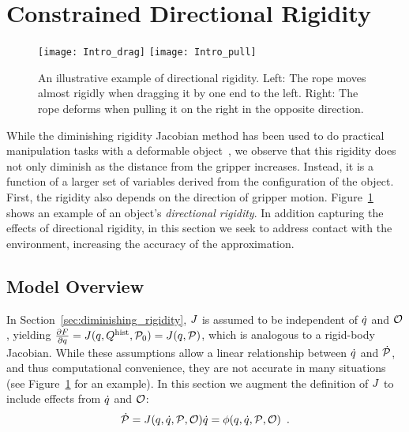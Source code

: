 
\section{Constrained Directional Rigidity}
\label{sec:constrained_model}

\begin{figure}[t]
    \centering
    \texttt{[image: Intro\_drag]}\hfill
    \texttt{[image: Intro\_pull]}%
    \caption{An illustrative example of directional rigidity. Left: The rope moves almost rigidly when dragging it by one end to the left. Right: The rope deforms when pulling it on the right in the opposite direction.}
    \label{fig:intro_directional_rigidity}
\end{figure}

While the diminishing rigidity Jacobian method has been used to do practical manipulation tasks with a deformable object~\cite{Berenson2013}, we observe that this rigidity does not only diminish as the distance from the gripper increases. Instead, it is a function of a larger set of variables derived from the configuration of the object. First, the rigidity also depends on the direction of gripper motion. Figure~\ref{fig:intro_directional_rigidity} shows an example of an object's \textit{directional rigidity}. In addition capturing the effects of directional rigidity, in this section we seek to address contact with the environment, increasing the accuracy of the approximation.

\subsection{Model Overview}

In Section~\ref{sec:diminishing_rigidity}, $J$ is assumed to be independent of $\dot{q}$ and $\mathcal{O}$, yielding $\frac{\partial F}{\partial q} = J(q, Q^{\textrm{hist}}, \mathcal{P}_0) = J(q, \mathcal{P})$, which is analogous to a rigid-body Jacobian. While these assumptions allow a linear relationship between $\dot{q}$ and $\dot{\mathcal{P}}$, and thus computational convenience, they are not accurate in many situations (see Figure~\ref{fig:intro_directional_rigidity} for an example). In this section we augment the definition of $J$ to include effects from $\dot{q}$ and $\mathcal{O}$:
\begin{equation}
    \dot{\mathcal{P}} = J(q, \dot{q}, \mathcal{P}, \mathcal{O}) \dot{q} = \phi(q, \dot{q}, \mathcal{P}, \mathcal{O}) \enspace .
\end{equation}

